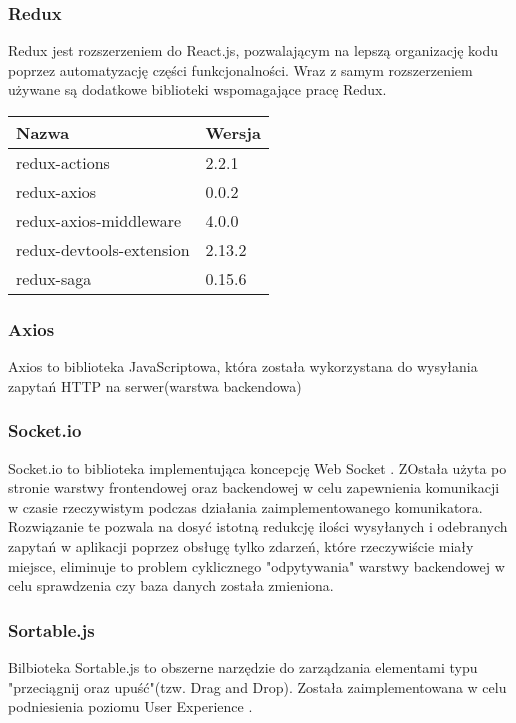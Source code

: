 \documentclass[eng,printmode]{mgr}
\begin{document}
\subsubsection{Redux}
Redux \cite {Redux} jest rozszerzeniem do React.js, pozwalającym na lepszą organizację kodu poprzez automatyzację części funkcjonalności. Wraz z samym rozszerzeniem używane są dodatkowe biblioteki wspomagające pracę Redux.
\\
\label{Tab. 2 - Biblioteki wykorzystujące Redux}
\begin{tabularx}{\textwidth}{|l|l|}
   \hline
    \textbf{Nazwa} & \textbf{Wersja} \\
   \hline
    redux-actions & 2.2.1 \\
   \hline
   	redux-axios & 0.0.2 \\
   \hline
  	redux-axios-middleware & 4.0.0 \\
   \hline
   	redux-devtools-extension & 2.13.2 \\
   \hline
  	redux-saga & 0.15.6 \\
   \hline
\end{tabularx}

\subsubsection{Axios}
Axios \cite {Axios} to biblioteka JavaScriptowa, która została wykorzystana do wysyłania zapytań HTTP na serwer(warstwa backendowa)

\subsubsection{Socket.io}
Socket.io \cite {Socket.io} to biblioteka implementująca koncepcję Web Socket \cite {web_socket}. ZOstała użyta po stronie warstwy frontendowej oraz backendowej w celu zapewnienia komunikacji w czasie rzeczywistym podczas działania zaimplementowanego komunikatora. Rozwiązanie te pozwala na dosyć istotną redukcję ilości wysyłanych i odebranych zapytań w aplikacji poprzez obsługę tylko zdarzeń, które rzeczywiście miały miejsce, eliminuje to problem cyklicznego "odpytywania" warstwy backendowej w celu sprawdzenia czy baza danych została zmieniona.

\subsubsection{Sortable.js}
Bilbioteka Sortable.js \cite{Sortable} to obszerne narzędzie do zarządzania elementami typu "przeciągnij oraz upuść"(tzw. Drag and Drop). Została zaimplementowana w celu podniesienia poziomu User Experience \cite {UX}.
\end{document}
